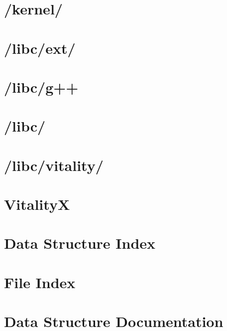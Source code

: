 \documentclass[twoside]{book}
\newcommand{\+}{\discretionary{\mbox{\scriptsize$\hookleftarrow$}}{}{}}
\begin{document}
\chapter{/kernel/}
\label{a00290}

\chapter{/libc/ext/}
\label{a00291}

\chapter{/libc/g++}
\label{a00292}

\chapter{/libc/}
\label{a00293}

\chapter{/libc/vitality/}
\label{a00294}

\chapter{VitalityX}
\label{a00295}

\chapter{Data Structure Index}

\chapter{File Index}

\chapter{Data Structure Documentation}


























\end{document}
